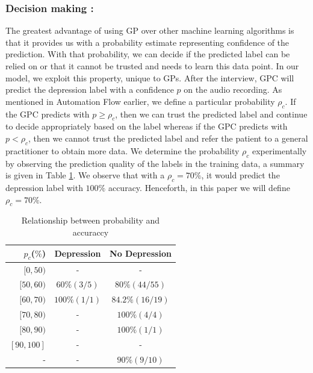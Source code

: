 \documentclass{article}
\begin{document}
    \subsubsection{Decision making :}
The greatest advantage of using GP over other machine learning algorithms is that it provides us with a probability estimate representing confidence of the prediction. 
    With that probability, we can decide if the predicted label can be relied on or that it cannot be trusted and needs to learn this data point. 
    In our model, we exploit this property, unique to GPs. 
    After the interview, GPC will predict the depression label with a confidence $p$ on the audio recording. 
    As mentioned in Automation Flow earlier, we define a particular probability $\rho_c$. 
    If the GPC predicts with $p \geq \rho_c$, then we can trust the predicted label and continue to decide appropriately based on the label whereas if the GPC predicts with $p < \rho_c$, then we cannot trust the predicted label and refer the patient to a general practitioner to obtain more data.
    We determine the probability $\rho_c$ experimentally by observing the prediction quality of the labels in the training data, a summary is given in Table \ref{tab:rho}. We observe that with a $\rho_c = 70\%$, it would predict the depression label with $100\%$ accuracy. 
    Henceforth, in this paper we will define $\rho_c = 70\%$.
    
     \begin{table}[h]
         \begin{center}
              \begin{tabular}{ | r | c | c | }
                \hline
                  \bfseries $p_c$($\%$)    & \bfseries Depression     & \bfseries No Depression \\ \hline
                 $[0,50)$        & -                 & -                          \\ \hline
                 $[50,60)$        & $60\%(3/5)$     & $80\%(44/55)$          \\ \hline 
                 $[60,70)$        & $100\%(1/1)$ & $84.2\%(16/19)$     \\ \hline
                 $[70,80)$        & -                 & $100\%(4/4)$             \\ \hline
                 $[80,90)$        & -                 & $100\%(1/1)$          \\ \hline 
                 $[90,100]$        & -                 & -                          \\ \hline
                 -                    & -                 & $90\%(9/10)$         \\ \hline
             \end{tabular}
        \end{center}
     \caption{Relationship between probability and accuraccy}
     \label{tab:rho}
     \end{table}
\end{document}
